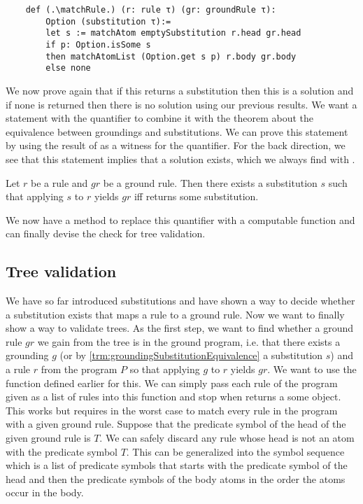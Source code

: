 \begin{lstlisting}
    def (.\matchRule.) (r: rule τ) (gr: groundRule τ):
        Option (substitution τ):=
        let s := matchAtom emptySubstitution r.head gr.head
        if p: Option.isSome s
        then matchAtomList (Option.get s p) r.body gr.body
        else none

\end{lstlisting}

We now prove again that if this returns a substitution then this is a solution and if none is returned then there is no solution using our previous results. 
We want a statement with the quantifier to combine it with the theorem about the equivalence between groundings and substitutions. We can prove this statement by using the result of \matchRule as a witness for the quantifier. For the back direction, we see that this statement implies that a solution exists, which we always find with \matchRule.

\begin{theorem}[\matchRuleIsSomeIffSolution]\label{trm:matchRule}
Let $r$  be a rule and $gr$ be a ground rule. Then there exists a substitution $s$ such that applying $s$ to $r$ yields $gr$ iff \matchRule returns some substitution.
\end{theorem}


We now have a method to replace this quantifier with a computable function and can finally devise the check for tree validation.

\subsection{Tree validation}

We have so far introduced substitutions and have shown a way to decide whether a substitution exists that maps a rule to a ground rule. Now we want to finally show a way to validate trees. As the first step, we want to find whether a ground rule $gr$ we gain from the tree is in the ground program, i.e. that there exists a grounding $g$ (or by \cref{trm:groundingSubstitutionEquivalence} a substitution $s$) and a rule $r$ from the program $P$ so that applying $g$ to $r$ yields $gr$. We want to use the \matchRule function defined earlier for this. 
We can simply pass each rule of the program given as a list of rules into this function and stop when \matchRule returns a some object. This works but requires in the worst case to match every rule in the program with a given ground rule. Suppose that the predicate symbol of the head of the given ground rule is $T$. We can safely discard any rule whose head is not an atom with the predicate symbol $T$. This can be generalized into the symbol sequence which is a list of predicate symbols that starts with the predicate symbol of the head and then the predicate symbols of the body atoms in the order the atoms occur in the body.

